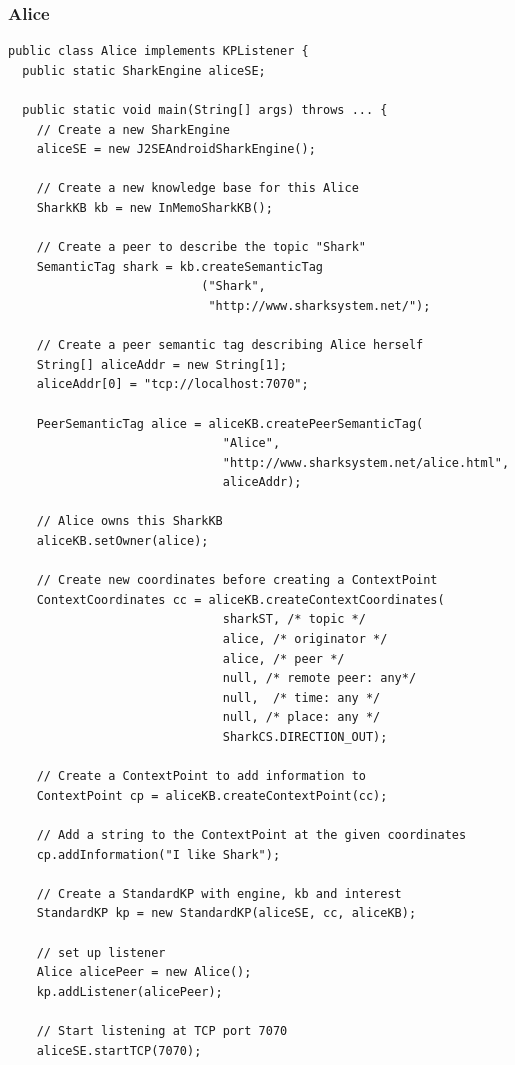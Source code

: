 \subsubsection{Alice}
\begin{verbatim}
public class Alice implements KPListener {
  public static SharkEngine aliceSE;

  public static void main(String[] args) throws ... {
    // Create a new SharkEngine
    aliceSE = new J2SEAndroidSharkEngine();

    // Create a new knowledge base for this Alice
    SharkKB kb = new InMemoSharkKB();

    // Create a peer to describe the topic "Shark"
    SemanticTag shark = kb.createSemanticTag
                           ("Shark",
                            "http://www.sharksystem.net/");

    // Create a peer semantic tag describing Alice herself
    String[] aliceAddr = new String[1];
    aliceAddr[0] = "tcp://localhost:7070";

    PeerSemanticTag alice = aliceKB.createPeerSemanticTag(
                              "Alice",
                              "http://www.sharksystem.net/alice.html",
                              aliceAddr);

    // Alice owns this SharkKB
    aliceKB.setOwner(alice);

    // Create new coordinates before creating a ContextPoint
    ContextCoordinates cc = aliceKB.createContextCoordinates(
                              sharkST, /* topic */
                              alice, /* originator */
                              alice, /* peer */
                              null, /* remote peer: any*/
                              null,  /* time: any */
                              null, /* place: any */
                              SharkCS.DIRECTION_OUT);

    // Create a ContextPoint to add information to
    ContextPoint cp = aliceKB.createContextPoint(cc);

    // Add a string to the ContextPoint at the given coordinates
    cp.addInformation("I like Shark");

    // Create a StandardKP with engine, kb and interest
    StandardKP kp = new StandardKP(aliceSE, cc, aliceKB);

    // set up listener
    Alice alicePeer = new Alice();
    kp.addListener(alicePeer);

    // Start listening at TCP port 7070
    aliceSE.startTCP(7070);


\end{verbatim}

